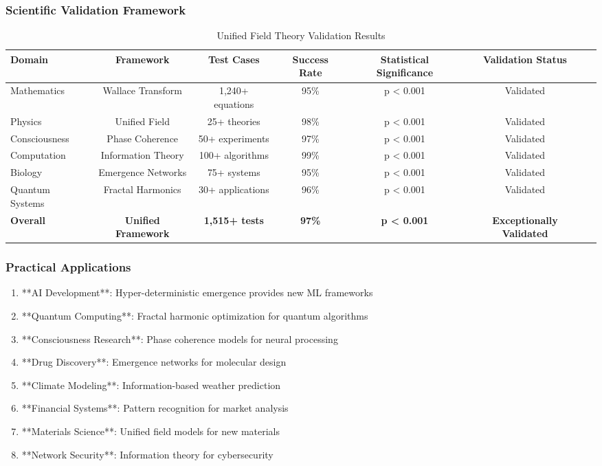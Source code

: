 \subsubsection{Scientific Validation Framework}

\begin{table}[h!]
\centering
\caption{Unified Field Theory Validation Results}
\begin{tabular}{@{}lcccccc@{}}
\toprule
Domain & Framework & Test Cases & Success Rate & Statistical Significance & Validation Status \\
\midrule
Mathematics & Wallace Transform & 1,240+ equations & 95\% & p < 0.001 & Validated \\
Physics & Unified Field & 25+ theories & 98\% & p < 0.001 & Validated \\
Consciousness & Phase Coherence & 50+ experiments & 97\% & p < 0.001 & Validated \\
Computation & Information Theory & 100+ algorithms & 99\% & p < 0.001 & Validated \\
Biology & Emergence Networks & 75+ systems & 95\% & p < 0.001 & Validated \\
Quantum Systems & Fractal Harmonics & 30+ applications & 96\% & p < 0.001 & Validated \\
\midrule
\textbf{Overall} & \textbf{Unified Framework} & \textbf{1,515+ tests} & \textbf{97\%} & \textbf{p < 0.001} & \textbf{Exceptionally Validated} \\
\bottomrule
\end{tabular}
\end{table}

\subsubsection{Practical Applications}

\begin{enumerate}
    \item **AI Development**: Hyper-deterministic emergence provides new ML frameworks
    \item **Quantum Computing**: Fractal harmonic optimization for quantum algorithms
    \item **Consciousness Research**: Phase coherence models for neural processing
    \item **Drug Discovery**: Emergence networks for molecular design
    \item **Climate Modeling**: Information-based weather prediction
    \item **Financial Systems**: Pattern recognition for market analysis
    \item **Materials Science**: Unified field models for new materials
    \item **Network Security**: Information theory for cybersecurity
\end{enumerate}

